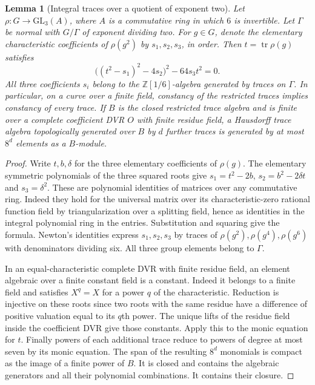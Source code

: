 \documentclass[a4paper,11pt]{article}
\newtheorem{lemma}[proposition]{Lemma}
\theoremstyle{definition}
\theoremstyle{remark}
\numberwithin{equation}{section}
\begin{document}
\begin{lemma}[Integral traces over a quotient of exponent two]\leavevmode
\label{lem:quadratictrace442}
Let \(\rho:G\to\mathrm{GL}_3(A)\), where \(A\) is a commutative
ring in which \(6\) is invertible. Let \(\Gamma\) be normal with
\(G/\Gamma\) of exponent dividing two. For \(g\in G\), denote the
elementary characteristic coefficients of \(\rho(g^2)\) by
\(s_1,s_2,s_3\), in order. Then \(t=\operatorname{tr}\rho(g)\)
satisfies
\[
       \bigl((t^2-s_1)^2-4s_2\bigr)^2-64s_3t^2=0.
\]
All three coefficients \(s_i\) belong to the
\(\mathbb Z[1/6]\)-algebra generated by traces on \(\Gamma\).
In particular, on a curve over a finite
field, constancy of the restricted traces implies constancy of
every trace. If \(B\) is the closed restricted trace algebra and
is finite over a complete coefficient DVR \(O\) with finite residue
field, a Hausdorff trace algebra topologically generated over \(B\)
by \(d\) further traces is generated by at most \(8^d\) elements
as a \(B\)-module.
\end{lemma}
\begin{proof}
Write \(t,b,\delta\) for the three elementary coefficients of
\(\rho(g)\). The elementary symmetric polynomials of the three
squared roots give \(s_1=t^2-2b\), \(s_2=b^2-2\delta t\) and
\(s_3=\delta^2\). These are polynomial identities of matrices over
any commutative ring. Indeed they hold for the universal matrix
over its characteristic-zero rational function field by
triangularization over a splitting field, hence as identities
in the integral polynomial ring in the entries. Substitution
and squaring give the formula. Newton's identities express
\(s_1,s_2,s_3\) by traces of \(\rho(g^2),\rho(g^4),\rho(g^6)\)
with denominators dividing six. All three group elements belong
to \(\Gamma\).

In an equal-characteristic complete DVR with finite residue
field, an element algebraic over a finite constant field is a
constant. Indeed it belongs to a finite field and satisfies
\(X^{q}=X\) for a power \(q\) of the characteristic. Reduction is
injective on these roots since two roots with the same residue
have a difference of positive valuation equal to its \(q\)th
power. The unique lifts of the residue field inside the coefficient
DVR give those constants. Apply this to the monic equation for
\(t\). Finally powers of each additional trace reduce to powers
of degree at most seven by its monic equation. The span of the
resulting \(8^d\) monomials is compact as the image of a finite
power of \(B\). It is closed and contains the algebraic generators
and all their polynomial combinations. It contains their closure.
\end{proof}
\end{document}
